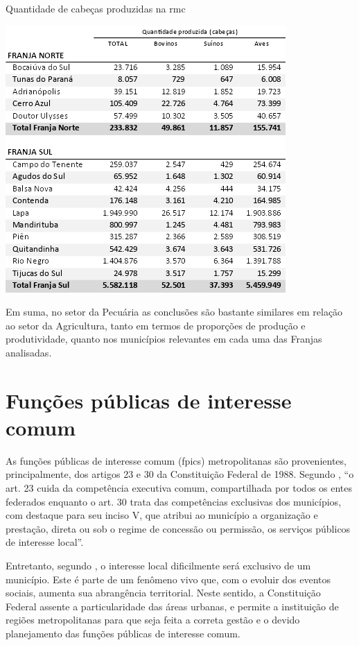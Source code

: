 	\begin{table}[h]
		\centering
		\caption{Quantidade de cabeças produzidas na \gls{rmc}}
		\includegraphics{img/rural_B}
		\label{tab:rural_B}
	\end{table}

	Em suma, no setor da Pecuária as conclusões são bastante similares em relação ao setor da Agricultura, tanto em termos de proporções de produção e produtividade, quanto nos municípios relevantes em cada uma das Franjas analisadas.

	\section{Funções públicas de interesse comum}
	
	As funções públicas de interesse comum (\gls{fpic}s) metropolitanas são provenientes, principalmente, dos artigos 23 e 30 da Constituição Federal de 1988. Segundo , ``o art. 23 cuida da competência executiva comum, compartilhada por todos os entes federados enquanto o art. 30 trata das competências exclusivas dos municípios, com destaque para seu inciso V, que atribui ao município a organização e prestação, direta ou sob o regime de concessão ou permissão, os serviços públicos de interesse local''.
	
	Entretanto, segundo , o interesse local dificilmente será exclusivo de um município. Este é parte de um fenômeno vivo que, com o evoluir dos eventos sociais, aumenta sua abrangência territorial. Neste sentido, a Constituição Federal assente a particularidade das áreas urbanas, e permite a instituição de regiões metropolitanas para que seja feita a correta gestão e o devido planejamento das funções públicas de interesse comum.
	

